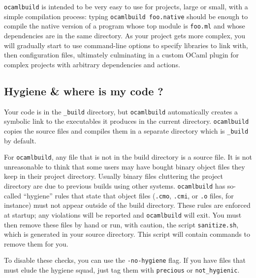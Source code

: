 \documentclass[9pt]{article}
\newcommand{\ocb}{\texttt{ocamlbuild}\xspace}
\begin{document}
\ocb is intended to be very easy to use for projects, large or small, with a simple
compilation process: typing
\texttt{ocamlbuild foo.native} should be enough to compile the native version
of a program whose top module is \texttt{foo.ml} and whose dependencies are in
the same directory.  As your project gets more complex, you will gradually
start to use command-line options to specify libraries to link with, then
configuration files, ultimately culminating in a custom OCaml plugin for
complex projects with arbitrary dependencies and actions.

\subsection{Hygiene \& where is my code ?}
Your code is in the \texttt{\_build} directory, but \ocb automatically creates
a symbolic link to the executables it produces in the current directory.
\ocb copies the source files and compiles them in a separate directory
which is \texttt{\_build} by default.

For \ocb, any file that is not in the build directory is a source file.
It is not unreasonable to think that some users may have bought binary object files
they keep in their project directory.  Usually binary files cluttering the project
directory are due to previous builds using other systems.  \ocb has so-called
``hygiene'' rules that state that object files (\texttt{.cmo}, \texttt{.cmi},
or \texttt{.o} files, for instance) must not appear outside of the build
directory.  These rules are enforced at startup; any violations will be reported
and \ocb will exit.  You must then remove these files by hand or run, with caution,
the script \texttt{sanitize.sh}, which is generated in your source directory.
This script will contain commands to remove them for you.

To disable these checks, you can use the \texttt{-no-hygiene} flag.  If you have
files that must elude the hygiene squad, just tag them with \texttt{precious}
or \texttt{not\_hygienic}.
\end{document}
